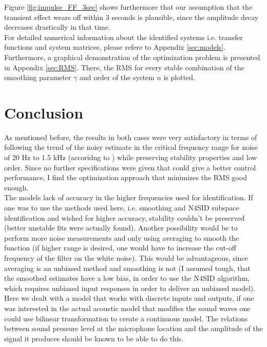 Figure \ref{fig:impulse_FF_3sec} shows furthermore that our assumption that the transient effect wears off within 3 seconds is plausible, since the amplitude decay decreases drastically in that time.\\

For detailed numerical information about the identified systems i.e. transfer functions and system matrices, please refere to Appendix \ref{sec:models}.\\

Furthermore, a graphical demonstration of the optimization problem is presented in Appendix \ref{sec:RMS}. There, the RMS for every stable combination of the smoothing parameter $\gamma$ and order of the system $n$ is plotted.

\chapter{Conclusion}\label{chap:conclusion}

As mentioned before, the results in both cases were very satisfactory in terms of following the trend of the noisy estimate in the critical frequency range for noise of 20 Hz to 1.5 kHz (accoridng to \cite{castae2010active}) while preserving stability properties and low order. Since no further specifications were given that could give a better control performance, I find the optimization approach that minimizes the RMS good enough.\\

The models lack of accuracy in the higher frequencies used for identification. If one was to use the methods used here, i.e. smoothing and N4SID subspace identification and wished for higher accuracy, stability couldn't be preserved (better unstable fits were actually found). Another possibility would be to perform more noise measurements and only using averaging to smooth the function (if higher range is desired, one would have to increase the cut-off frequency of the filter on the white noise). This would be advantageous, since averaging is an unbiased method and smoothing is not (I assumed tough, that the smoothed estimates have a low bias, in order to use the N4SID algorithm, which requires unbiased input responses in order to deliver an unbiased model).\\

Here we dealt with a model that works with discrete inputs and outputs, if one was interested in the actual acoustic model that modifies the sound waves one could use bilinear transformation to create a continuous model. The relations between sound pressure level at the microphone location and the amplitude of the signal it produces should be known to be able to do this.\\

